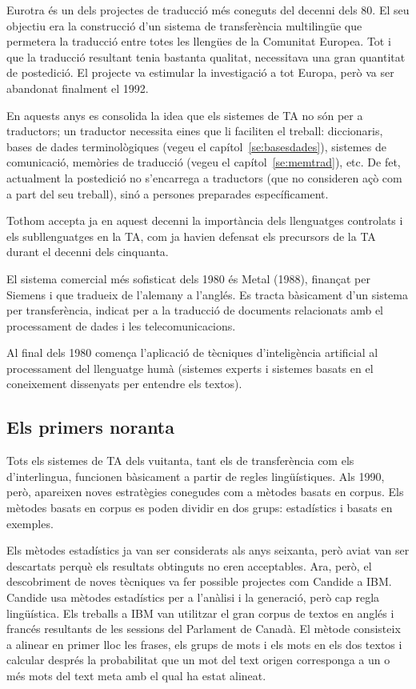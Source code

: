 Eurotra és un dels projectes de traducció més coneguts del decenni 
dels 80. El seu objectiu era la 
construcció d'un sistema de transferència multilingüe 
que permetera la traducció entre totes les llengües 
de la Comunitat Europea. 
Tot i que la traducció resultant 
tenia bastanta qualitat, necessitava una gran quantitat de 
postedició. El projecte va estimular la investigació a
tot Europa, però va ser abandonat finalment el 1992.

En aquests anys es consolida la idea que els
sistemes de TA no són per a traductors; un traductor necessita eines 
que li faciliten el treball: diccionaris, 
bases de dades terminològiques (vegeu el capítol~\ref{se:basesdades}), 
sistemes de 
comunicació, memòries de traducció (vegeu el
capítol~\ref{se:memtrad}), etc.
De fet, actualment la postedició no s'encarrega a 
traductors (que no consideren açò 
com a part del seu treball), 
sinó a persones preparades específicament.

Tothom accepta ja en aquest decenni la importància dels llenguatges
controlats i els subllenguatges en la TA, com ja havien defensat els
precursors de la TA durant el decenni dels cinquanta.

El sistema comercial més sofisticat dels 1980 és Metal (1988),
finançat per Siemens i 
que tradueix de l'alemany a l'anglés. 
Es tracta bàsicament d'un sistema per transferència, indicat per 
a la traducció de documents 
relacionats amb el processament de dades i les telecomunicacions. 

Al final dels 1980 comença l'aplicació de tècniques d'inteligència
artificial
al processament del llenguatge 
humà (sistemes experts i sistemes basats 
en el coneixement dissenyats per entendre els textos).

\subsection{Els primers noranta}

Tots els sistemes de TA dels vuitanta, tant els de transferència 
com els d'interlingua, funcionen bàsicament a 
partir de regles lingüístiques. Als 1990, però,
apareixen noves estratègies conegudes com a mètodes basats en 
corpus. Els mètodes basats en corpus es poden dividir 
en dos grups: estadístics i basats en exemples.

Els mètodes estadístics ja van ser considerats als anys seixanta, però
aviat van ser descartats perquè els resultats obtinguts no eren
acceptables. Ara, però, el descobriment de noves tècniques va fer
possible projectes com Candide a IBM. Candide usa mètodes estadístics
per a l'anàlisi i la generació, però cap regla lingüística. Els
treballs a IBM van utilitzar el gran corpus de textos en anglés i
francés resultants de les sessions del Parlament de Canadà.  El mètode
consisteix a alinear en primer lloc les frases, els grups de mots i
els mots en els dos textos i calcular després la probabilitat que un
mot del text origen corresponga a un o més mots del text meta amb el
qual ha estat alineat.

